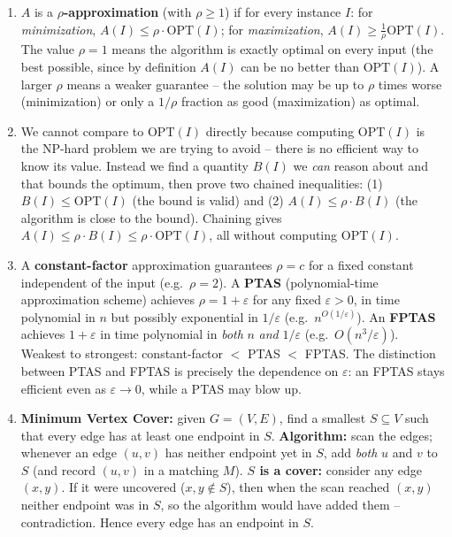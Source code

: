 \documentclass[11pt]{article}
\begin{document}
\begin{enumerate}[label=\textbf{A\arabic*.}, leftmargin=2.2em]

\item $A$ is a \textbf{$\rho$-approximation} (with $\rho \ge 1$) if for every instance
$I$: for \emph{minimization}, $A(I) \le \rho\cdot\mathrm{OPT}(I)$; for \emph{maximization},
$A(I) \ge \tfrac{1}{\rho}\mathrm{OPT}(I)$. The value $\rho = 1$ means the algorithm is
exactly optimal on every input (the best possible, since by definition $A(I)$ can be no
better than $\mathrm{OPT}(I)$). A larger $\rho$ means a weaker guarantee -- the solution
may be up to $\rho$ times worse (minimization) or only a $1/\rho$ fraction as good
(maximization) as optimal.

\item We cannot compare to $\mathrm{OPT}(I)$ directly because computing $\mathrm{OPT}(I)$
is the NP-hard problem we are trying to avoid -- there is no efficient way to know its
value. Instead we find a quantity $B(I)$ we \emph{can} reason about and that bounds the
optimum, then prove two chained inequalities: (1) $B(I) \le \mathrm{OPT}(I)$ (the bound is
valid) and (2) $A(I) \le \rho\cdot B(I)$ (the algorithm is close to the bound). Chaining
gives $A(I) \le \rho\cdot B(I) \le \rho\cdot\mathrm{OPT}(I)$, all without computing
$\mathrm{OPT}(I)$.

\item A \textbf{constant-factor} approximation guarantees $\rho = c$ for a fixed constant
independent of the input (e.g.\ $\rho = 2$). A \textbf{PTAS} (polynomial-time
approximation scheme) achieves $\rho = 1 + \varepsilon$ for any fixed $\varepsilon > 0$, in
time polynomial in $n$ but possibly exponential in $1/\varepsilon$ (e.g.\
$n^{O(1/\varepsilon)}$). An \textbf{FPTAS} achieves $1 + \varepsilon$ in time polynomial in
\emph{both} $n$ \emph{and} $1/\varepsilon$ (e.g.\ $O(n^3/\varepsilon)$). Weakest to
strongest: constant-factor $<$ PTAS $<$ FPTAS. The distinction between PTAS and FPTAS is
precisely the dependence on $\varepsilon$: an FPTAS stays efficient even as $\varepsilon
\to 0$, while a PTAS may blow up.

\item \textbf{Minimum Vertex Cover:} given $G = (V, E)$, find a smallest $S \subseteq V$
such that every edge has at least one endpoint in $S$. \textbf{Algorithm:} scan the edges;
whenever an edge $(u,v)$ has neither endpoint yet in $S$, add \emph{both} $u$ and $v$ to
$S$ (and record $(u,v)$ in a matching $M$). \textbf{$S$ is a cover:} consider any edge
$(x,y)$. If it were uncovered ($x,y \notin S$), then when the scan reached $(x,y)$ neither
endpoint was in $S$, so the algorithm would have added them -- contradiction. Hence every
edge has an endpoint in $S$.


\end{enumerate}
\end{document}
